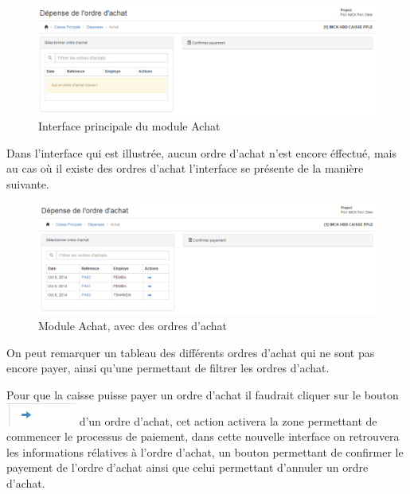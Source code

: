 \documentclass[12pt,a4paper]{report}
\begin{document}
\begin{figure}[h]
\begin{center}
\includegraphics[width=14cm]{pic/Achat.png}
\end{center}
\caption{Interface principale du module Achat}
\label{Interface principale du module Achat}
\end{figure}

Dans l'interface qui est illustrée, aucun ordre d'achat n'est encore éffectué, mais au cas où il existe des ordres d'achat l'interface se présente de la manière suivante.

\begin{figure}[h]
\begin{center}
\includegraphics[width=14cm]{pic/Achat2.png}
\end{center}
\caption{Module Achat, avec des ordres d'achat}
\label{Module Achat, avec des ordres d'achat}
\end{figure}

On peut remarquer un tableau des différents ordres d'achat qui ne sont pas encore payer, ainsi qu'une permettant de filtrer les ordres d'achat. 

\newpage
Pour que la caisse puisse payer un ordre d'achat il faudrait cliquer sur le bouton \includegraphics[scale=0.7]{pic/SelectedPOrder.png} d'un ordre d'achat, cet action activera la zone permettant de commencer le processus de paiement, dans cette nouvelle interface on retrouvera les informations rélatives à l'ordre d'achat, un bouton permettant de confirmer le payement de l'ordre d'achat ainsi que celui permettant d'annuler un ordre d'achat.
\end{document}
